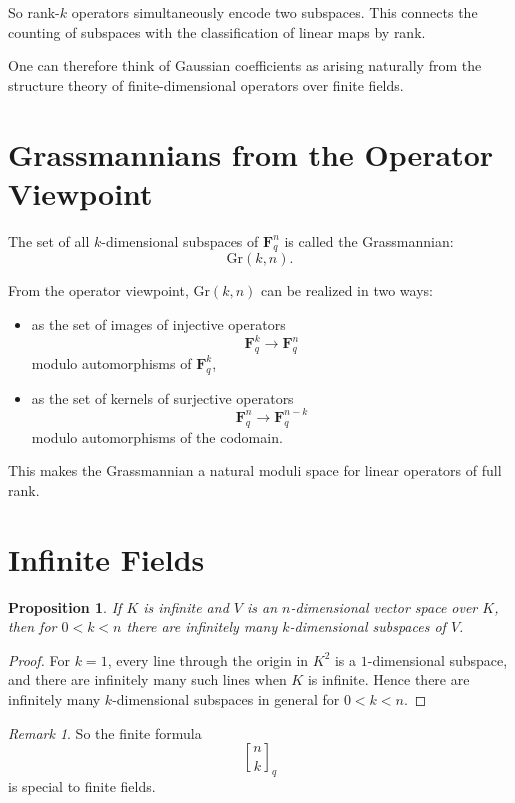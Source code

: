 \documentclass[11pt]{article}
\newtheorem{proposition}[theorem]{Proposition}
\theoremstyle{definition}
\theoremstyle{remark}
\newtheorem{remark}[theorem]{Remark}
\newcommand{\F}{\mathbf{F}}
\newcommand{\Gr}{\mathrm{Gr}}
\newcommand{\qbinom}[2]{\genfrac{[}{]}{0pt}{}{#1}{#2}_q}
\begin{document}
	So rank-\(k\) operators simultaneously encode two subspaces. This connects the counting of subspaces with the classification of linear maps by rank.
	
	One can therefore think of Gaussian coefficients as arising naturally from the structure theory of finite-dimensional operators over finite fields.
	
	\section{Grassmannians from the Operator Viewpoint}
	
	The set of all \(k\)-dimensional subspaces of \(\F_q^n\) is called the Grassmannian:
	\[
	\Gr(k,n).
	\]
	
	From the operator viewpoint, \(\Gr(k,n)\) can be realized in two ways:
	
	\begin{itemize}
		\item as the set of images of injective operators
		\[
		\F_q^k \to \F_q^n
		\]
		modulo automorphisms of \(\F_q^k\),
		\item as the set of kernels of surjective operators
		\[
		\F_q^n \to \F_q^{n-k}
		\]
		modulo automorphisms of the codomain.
	\end{itemize}
	
	This makes the Grassmannian a natural moduli space for linear operators of full rank.
	
	\section{Infinite Fields}
	
	\begin{proposition}
		If \(K\) is infinite and \(V\) is an \(n\)-dimensional vector space over \(K\), then for \(0<k<n\) there are infinitely many \(k\)-dimensional subspaces of \(V\).
	\end{proposition}
	
	\begin{proof}
		For \(k=1\), every line through the origin in \(K^2\) is a \(1\)-dimensional subspace, and there are infinitely many such lines when \(K\) is infinite. Hence there are infinitely many \(k\)-dimensional subspaces in general for \(0<k<n\).
	\end{proof}
	
	\begin{remark}
		So the finite formula
		\[
		\qbinom{n}{k}
		\]
		is special to finite fields.
	\end{remark}
	
\end{document}

